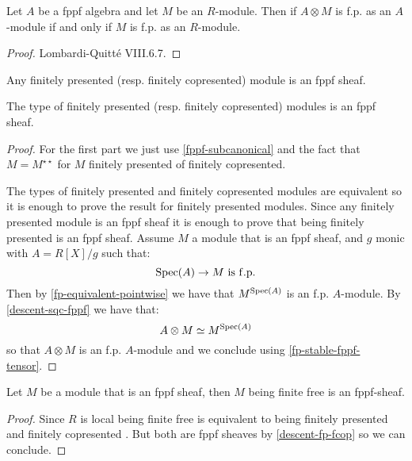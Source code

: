 \begin{lemma}\label{fp-stable-fppf-tensor}
Let $A$ be a fppf algebra and let $M$ be an $R$-module. Then if $A\otimes M$ is f.p. as an $A$-module if and only if $M$ is f.p. as an $R$-module.
\end{lemma}

\begin{proof}
Lombardi-Quitté VIII.6.7.
\end{proof}

\begin{lemma}\label{descent-fp-fcop}
Any finitely presented (resp. finitely copresented) module is an fppf sheaf.

The type of finitely presented (resp. finitely copresented) modules is an fppf sheaf.
\end{lemma}

\begin{proof}
For the first part we just use \cref{fppf-subcanonical} and the fact that $M=M^{\star\star}$ for $M$ finitely presented of finitely copresented.

The types of finitely presented and finitely copresented modules are equivalent so it is enough to prove the result for finitely presented modules. Since any finitely presented module is an fppf sheaf it is enough to prove that being finitely presented is an fppf sheaf. Assume $M$ a module that is an fppf sheaf, and $g$ monic with $A=R[X]/g$ such that:
\[\Spec(A)\to M\ \mathrm{is\ f.p.}\]
Then by \cref{fp-equivalent-pointwise} we have that $M^{\operatorname{Spec}(A)}$ is an f.p. $A$-module. By \cref{descent-sqc-fppf} we have that:
\[A\otimes M \simeq M^{\operatorname{Spec}(A)}\]
so that $A\otimes M$ is an f.p. $A$-module and we conclude using \cref{fp-stable-fppf-tensor}.
\end{proof}

\begin{proposition}
Let $M$ be a module that is an fppf sheaf, then $M$ being finite free is an fppf-sheaf.
\end{proposition}

\begin{proof}
Since $R$ is local being finite free is equivalent to being finitely presented and finitely copresented \cite{TODO}. But both are fppf sheaves by \cref{descent-fp-fcop} so we can conclude.
\end{proof}

